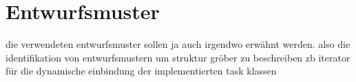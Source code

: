 %        
%        
	
	\section{Entwurfsmuster}
	die verwendeten entwurfsmuster sollen ja auch irgendwo erwähnt werden.
	also die identifikation von entwurfsmustern um struktur gröber zu beschreiben
	zb iterator für die dynamische einbindung der implementierten task klassen
	        